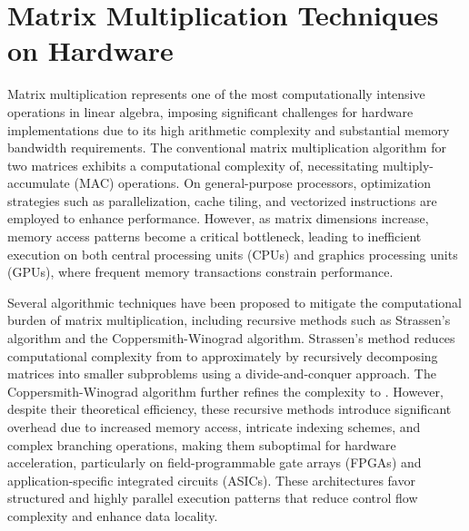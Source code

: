 
\section{Matrix Multiplication Techniques on Hardware}
Matrix multiplication represents one of the most computationally intensive operations in linear algebra, imposing significant challenges for hardware implementations due to its high arithmetic complexity and substantial memory bandwidth requirements. The conventional matrix multiplication algorithm for two matrices exhibits a computational complexity of, necessitating multiply-accumulate (MAC) operations. On general-purpose processors, optimization strategies such as parallelization, cache tiling, and vectorized instructions are employed to enhance performance\cite{mm-technique-1}. However, as matrix dimensions increase, memory access patterns become a critical bottleneck, leading to inefficient execution on both central processing units (CPUs) and graphics processing units (GPUs), where frequent memory transactions constrain performance\cite{svd_architecture-4}.

Several algorithmic techniques have been proposed to mitigate the computational burden of matrix multiplication, including recursive methods such as Strassen’s algorithm and the Coppersmith-Winograd algorithm. Strassen’s method reduces computational complexity from to approximately by recursively decomposing matrices into smaller subproblems using a divide-and-conquer approach\cite{mm-techniques-2}. The Coppersmith-Winograd algorithm\cite{mm-techniques-3} further refines the complexity to . However, despite their theoretical efficiency, these recursive methods introduce significant overhead due to increased memory access, intricate indexing schemes, and complex branching operations, making them suboptimal for hardware acceleration, particularly on field-programmable gate arrays (FPGAs) and application-specific integrated circuits (ASICs). These architectures favor structured and highly parallel execution patterns that reduce control flow complexity and enhance data locality.

